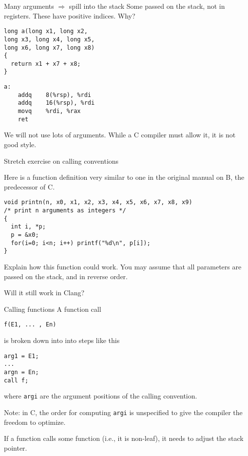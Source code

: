 \documentclass[landscape]{beamer}
\begin{document}
\begin{frame}[fragile]{Many arguments $\Rightarrow$ spill into the stack}
Some passed on the stack, not in registers. These have positive indices. Why?
\\[2em]

\begin{minipage}{.55\textwidth}
\begin{verbatim}
long a(long x1, long x2, 
long x3, long x4, long x5, 
long x6, long x7, long x8)
{
  return x1 + x7 + x8;
}
\end{verbatim}
\end{minipage}
%
\begin{minipage}{.4\textwidth}
\begin{verbatim}
a:                             
	addq	8(%rsp), %rdi
	addq	16(%rsp), %rdi
	movq	%rdi, %rax
	ret
\end{verbatim}
\end{minipage}
\vspace{2em}

We will not use lots of arguments. While a C compiler must allow it, it is not good style.

\end{frame}


\begin{frame}[fragile]{Stretch exercise on calling conventions}

Here is a function definition very similar to one in the original manual on B, the predecessor of C.
\begin{verbatim}
void printn(n, x0, x1, x2, x3, x4, x5, x6, x7, x8, x9)
/* print n arguments as integers */
{
  int i, *p;
  p = &x0;
  for(i=0; i<n; i++) printf("%d\n", p[i]); 
}
\end{verbatim}
Explain how this function could work. You may assume that all parameters are passed on the stack, and in reverse order. 

Will it still work in Clang?
\end{frame}

\begin{frame}[fragile]{Calling functions}
A function call
\begin{verbatim}
f(E1, ... , En)
\end{verbatim}
is broken down into into steps like this
\begin{verbatim}
arg1 = E1;
...
argn = En;
call f;
\end{verbatim}
where \texttt{argi} are the argument positions of the calling convention.

Note: in C, the order for computing \texttt{argi} is unspecified to give the compiler the freedom to optimize.

If a function calls some function (i.e., it is non-leaf), it needs to adjust the stack pointer.
\end{frame}
\end{document}
